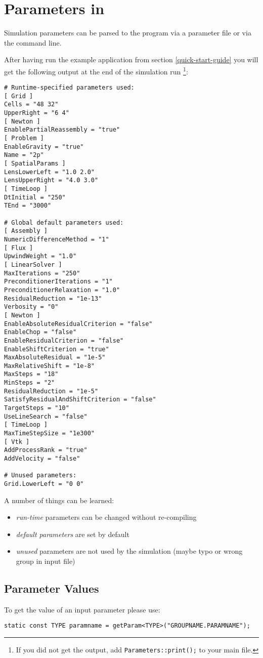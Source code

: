\section{Parameters in \Dumux}
\label{sc_parameterfiles}
Simulation parameters can be parsed to the program via a parameter file or via the command line.

After having run the example application from section \ref{quick-start-guide} you will
get the following output at the end of the simulation run
\footnote{If you did not get the output, add \texttt{Parameters::print();} to your main file.}:
\begin{lstlisting}[style=Bash]
# Runtime-specified parameters used:
[ Grid ]
Cells = "48 32"
UpperRight = "6 4"
[ Newton ]
EnablePartialReassembly = "true"
[ Problem ]
EnableGravity = "true"
Name = "2p"
[ SpatialParams ]
LensLowerLeft = "1.0 2.0"
LensUpperRight = "4.0 3.0"
[ TimeLoop ]
DtInitial = "250"
TEnd = "3000"

# Global default parameters used:
[ Assembly ]
NumericDifferenceMethod = "1"
[ Flux ]
UpwindWeight = "1.0"
[ LinearSolver ]
MaxIterations = "250"
PreconditionerIterations = "1"
PreconditionerRelaxation = "1.0"
ResidualReduction = "1e-13"
Verbosity = "0"
[ Newton ]
EnableAbsoluteResidualCriterion = "false"
EnableChop = "false"
EnableResidualCriterion = "false"
EnableShiftCriterion = "true"
MaxAbsoluteResidual = "1e-5"
MaxRelativeShift = "1e-8"
MaxSteps = "18"
MinSteps = "2"
ResidualReduction = "1e-5"
SatisfyResidualAndShiftCriterion = "false"
TargetSteps = "10"
UseLineSearch = "false"
[ TimeLoop ]
MaxTimeStepSize = "1e300"
[ Vtk ]
AddProcessRank = "true"
AddVelocity = "false"

# Unused parameters:
Grid.LowerLeft = "0 0"
\end{lstlisting}

A number of things can be learned:
\begin{itemize}
  \item \emph{run-time} parameters can be changed without re-compiling
  \item \emph{default parameters} are set by default
  \item \emph{unused} parameters are not used by the simulation (maybe typo or wrong group in input file)
\end{itemize}


\subsection{Parameter Values}
To get the value of an input parameter please use:
\begin{lstlisting}[name=propsyscars,style=DumuxCode]
static const TYPE paramname = getParam<TYPE>("GROUPNAME.PARAMNAME");
\end{lstlisting}

